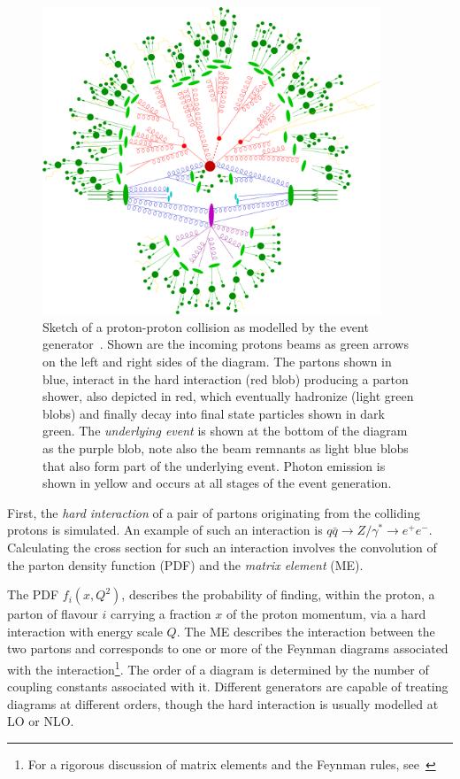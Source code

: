 \begin{figure}[p]
  \centering
  \includegraphics[width=0.90\textwidth]{PartDetector/Diagrams/scetch.eps}
  \caption[Sketch of a proton-proton collision as modelled by the event generator.]{Sketch of a proton-proton collision as modelled by the event generator~\cite{Event}. Shown are the incoming protons beams as green arrows on the left and right sides of the diagram. The partons shown in blue, interact in the hard interaction (red blob) producing a parton shower, also depicted in red, which eventually hadronize (light green blobs) and finally decay into final state particles shown in dark green. The \emph{underlying event} is shown at the bottom of the diagram as the purple blob, note also the beam remnants as light blue blobs that also form part of the underlying event. Photon emission is shown in yellow and occurs at all stages of the event generation.}
  \label{fig:DetectorEGSketch}
\end{figure}

First, the \emph{hard interaction} of a pair of partons originating from the colliding protons is simulated. An example of such an interaction is $q\bar{q} \rightarrow Z / \gamma^{*}\rightarrow e^{+}e^{-}$. Calculating the cross section for such an interaction involves the convolution of the parton density function (PDF) and the \emph{matrix element} (ME).

The PDF $f_i(x,Q^2)$, describes the probability of finding, within the proton, a parton of flavour $i$ carrying a fraction $x$ of the proton momentum, via a hard interaction with energy scale $Q$. The ME describes the interaction between the two partons and corresponds to one or more of the Feynman diagrams associated with the interaction\footnote{For a rigorous discussion of matrix elements and the Feynman rules, see~\cite{Theory:Perkins,Theory:IntroGriffiths}}. The order of a diagram is determined by the number of coupling constants associated with it. Different generators are capable of treating diagrams at different orders, though the hard interaction is usually modelled at LO or NLO.

